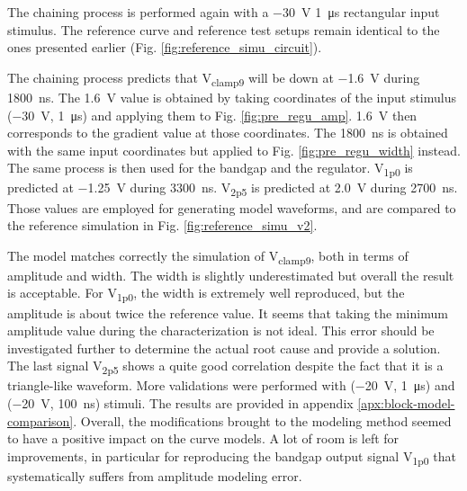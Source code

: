 The chaining process is performed again with a \SI{-30}{\volt} \SI{1}{\micro\second} rectangular input stimulus.
The reference curve and reference test setups remain identical to the ones presented earlier (Fig. \ref{fig:reference_simu_circuit}).

The chaining process predicts that V\textsubscript{clamp9} will be down at \SI{-1.6}{\volt} during \SI{1800}{\nano\second}.
The \SI{1.6}{\volt} value is obtained by taking coordinates of the input stimulus (\SI{-30}{\volt}, \SI{1}{\micro\second}) and applying them to Fig. \ref{fig:pre_regu_amp}.
\SI{1.6}{\volt} then corresponds to the gradient value at those coordinates.
The \SI{1800}{\nano\second} is obtained with the same input coordinates but applied to Fig. \ref{fig:pre_regu_width} instead.
The same process is then used for the bandgap and the regulator.
V\textsubscript{1p0} is predicted at \SI{-1.25}{\volt} during \SI{3300}{\nano\second}.
V\textsubscript{2p5} is predicted at \SI{2.0}{\volt} during \SI{2700}{\nano\second}.
Those values are employed for generating model waveforms, and are compared to the reference simulation in Fig. \ref{fig:reference_simu_v2}.

The model matches correctly the simulation of V\textsubscript{clamp9}, both in terms of amplitude and width.
The width is slightly underestimated but overall the result is acceptable.
For V\textsubscript{1p0}, the width is extremely well reproduced, but the amplitude is about twice the reference value.
It seems that taking the minimum amplitude value during the characterization is not ideal.
This error should be investigated further to determine the actual root cause and provide a solution.
The last signal V\textsubscript{2p5} shows a quite good correlation despite the fact that it is a triangle-like waveform.
More validations were performed with (\SI{-20}{\volt}, \SI{1}{\micro\second}) and (\SI{-20}{\volt}, \SI{100}{\nano\second}) stimuli.
The results are provided in appendix \ref{apx:block-model-comparison}.
Overall, the modifications brought to the modeling method seemed to have a positive impact on the curve models.
A lot of room is left for improvements, in particular for reproducing the bandgap output signal V\textsubscript{1p0} that systematically suffers from amplitude modeling error.

